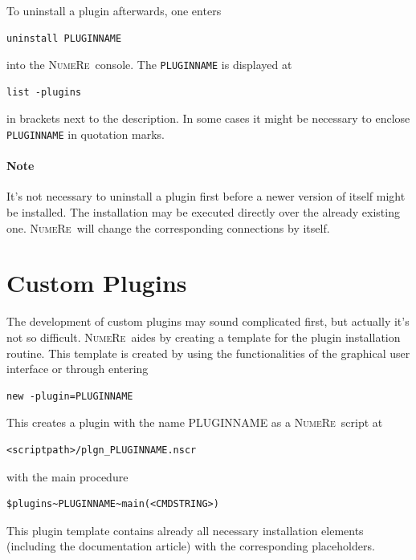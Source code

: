 \documentclass[DIV=14,headsepline,footsepline]{scrbook}
\newcommand{\NR}{\textsc{Nu\-me\-Re}}
\begin{document}
				To uninstall a plugin afterwards, one enters
				\begin{lstlisting}
uninstall PLUGINNAME
				\end{lstlisting}
				into the \NR\ console. The \lstinline+PLUGINNAME+ is displayed at
				\begin{lstlisting}
list -plugins
				\end{lstlisting}
				in brackets next to the description. In some cases it might be necessary to enclose \lstinline+PLUGINNAME+ in quotation marks.
				\paragraph{Note}
					It's not necessary to uninstall a plugin first before a newer version of itself might be installed. The installation may be executed directly over the already existing one. \NR\ will change the corresponding connections by itself.
			\section{Custom Plugins}
				The development of custom plugins may sound complicated first, but actually it's not so difficult. \NR\ aides by creating a template for the plugin installation routine. This template is created by using the functionalities of the graphical user interface or through entering
				\begin{lstlisting}
new -plugin=PLUGINNAME
				\end{lstlisting}
				This creates a plugin with the name PLUGINNAME as a \NR\ script at
				\begin{lstlisting}
<scriptpath>/plgn_PLUGINNAME.nscr
				\end{lstlisting}
				with the main procedure
				\begin{lstlisting}
$plugins~PLUGINNAME~main(<CMDSTRING>)
				\end{lstlisting}
				This plugin template contains already all necessary installation elements (including the documentation article) with the corresponding placeholders.
				
\end{document}

